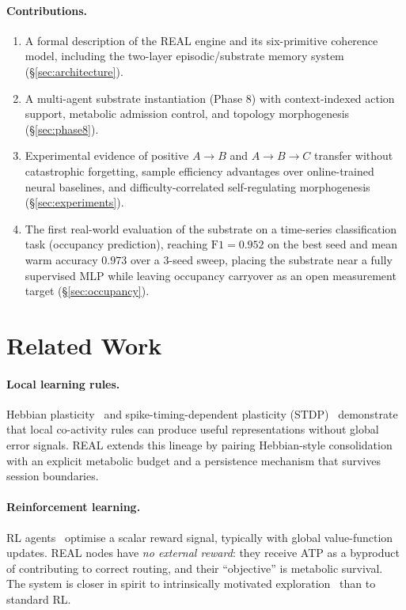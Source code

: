 \documentclass[10pt,twocolumn]{article}
\begin{document}
\paragraph{Contributions.}
\begin{enumerate}[leftmargin=*, topsep=2pt, itemsep=1pt]
  \item A formal description of the REAL engine and its six-primitive coherence
        model, including the two-layer episodic/substrate memory system
        (\S\ref{sec:architecture}).
  \item A multi-agent substrate instantiation (Phase 8) with context-indexed
        action support, metabolic admission control, and topology
        morphogenesis (\S\ref{sec:phase8}).
  \item Experimental evidence of positive $A \to B$ and $A \to B \to C$ transfer
        without catastrophic forgetting, sample efficiency advantages over
        online-trained neural baselines, and difficulty-correlated
        self-regulating morphogenesis (\S\ref{sec:experiments}).
  \item The first real-world evaluation of the substrate on a time-series
        classification task (occupancy prediction), reaching $\mathrm{F1} =
        0.952$ on the best seed and mean warm accuracy $0.973$ over a
        3-seed sweep, placing the substrate near a fully supervised MLP while
        leaving occupancy carryover as an open measurement target
        (\S\ref{sec:occupancy}).
\end{enumerate}

\section{Related Work}
\label{sec:related}

\paragraph{Local learning rules.}
Hebbian plasticity~\citep{hebb1949organization} and spike-timing-dependent
plasticity (STDP)~\citep{bi1998synaptic} demonstrate that local co-activity
rules can produce useful representations without global error signals.
REAL extends this lineage by pairing Hebbian-style consolidation with an
explicit metabolic budget and a persistence mechanism that survives session
boundaries.

\paragraph{Reinforcement learning.}
RL agents~\citep{sutton2018reinforcement} optimise a scalar reward signal,
typically with global value-function updates.
REAL nodes have \emph{no external reward}: they receive ATP as a byproduct of
contributing to correct routing, and their ``objective'' is metabolic survival.
The system is closer in spirit to intrinsically motivated
exploration~\citep{oudeyer2007intrinsic} than to standard RL.
\end{document}

